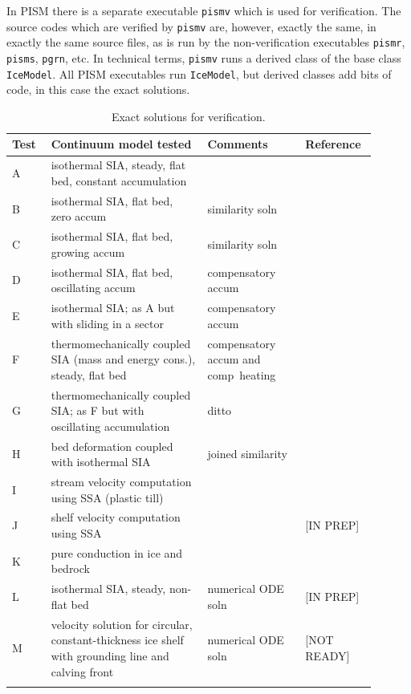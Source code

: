\documentclass[11pt,final]{amsart}
\begin{document}
In PISM there is a separate executable \verb|pismv| which is used for verification.  The source codes which are verified by \verb|pismv| are, however, exactly the same, in exactly the same source files, as is run by the non-verification executables \verb|pismr|, \verb|pisms|, \verb|pgrn|, etc.  In technical terms, \verb|pismv| runs a derived class of the base class \verb|IceModel|.  All PISM executables run \verb|IceModel|, but derived classes add bits of code, in this case the exact solutions.

\begin{table}[ht]
\caption{Exact solutions for verification.}\label{tab:tests}
\small
\begin{tabular}{p{0.1\linewidth}p{0.4\linewidth}p{0.25\linewidth}p{0.15\linewidth}}\hline
\textbf{Test} & \textbf{Continuum model tested} & \textbf{Comments} & \textbf{Reference} \\ \hline
A & isothermal SIA, steady,  flat bed, constant accumulation &  & \cite{BLKCB} \\
B & isothermal SIA, flat bed, zero accum & similarity soln & \cite{BLKCB,Halfar83} \\
C & isothermal SIA, flat bed, growing accum & similarity soln & \cite{BLKCB} \\
D & isothermal SIA, flat bed, oscillating accum & compensatory accum & \cite{BLKCB} \\
E & isothermal SIA; as A  but with sliding in a sector &  compensatory accum & \cite{BLKCB} \\
F & thermomechanically coupled SIA (mass and energy cons.), steady, flat bed &  compensatory accum and comp~heating& \cite{BB,BBL} \\
G & thermomechanically coupled SIA; as F  but with oscillating accumulation  & ditto & \cite{BB,BBL} \\
H & bed deformation coupled with isothermal SIA & joined similarity & \cite{BLKfastearth} \\
I & stream velocity computation using SSA (plastic till) &  & \cite{SchoofStream,BBssasliding} \\
J & shelf velocity computation using SSA  &  & [IN PREP] \\
K & pure conduction in ice and bedrock & & \cite{BuelerTestK} \\
L & isothermal SIA, steady, non-flat bed & numerical ODE soln & [IN PREP] \\
M & velocity solution for circular, constant-thickness  ice shelf with grounding line and calving front & numerical ODE soln & [NOT READY] \\
\hline
\normalsize
\end{tabular}
\end{table}
\end{document}
